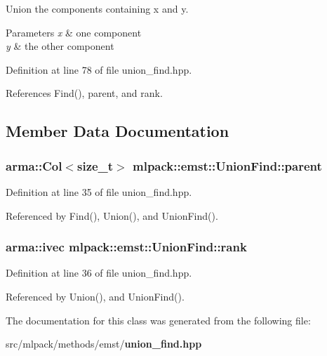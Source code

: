 Union the components containing x and y. 


\begin{DoxyParams}{Parameters}
{\em x} & one component \\
\hline
{\em y} & the other component \\
\hline
\end{DoxyParams}


Definition at line 78 of file union\-\_\-find.\-hpp.



References Find(), parent, and rank.



\subsection{Member Data Documentation}
\subsubsection[{parent}]{\setlength{\rightskip}{0pt plus 5cm}arma\-::\-Col$<$size\-\_\-t$>$ mlpack\-::emst\-::\-Union\-Find\-::parent\hspace{0.3cm}{\ttfamily [private]}}\label{classmlpack_1_1emst_1_1UnionFind_ab989de421794b4bc4ab930bec5a2c40b}


Definition at line 35 of file union\-\_\-find.\-hpp.



Referenced by Find(), Union(), and Union\-Find().

\subsubsection[{rank}]{\setlength{\rightskip}{0pt plus 5cm}arma\-::ivec mlpack\-::emst\-::\-Union\-Find\-::rank\hspace{0.3cm}{\ttfamily [private]}}\label{classmlpack_1_1emst_1_1UnionFind_a19f06f49e59750a0c06c1d781fc31476}


Definition at line 36 of file union\-\_\-find.\-hpp.



Referenced by Union(), and Union\-Find().



The documentation for this class was generated from the following file\-:\begin{DoxyCompactItemize}
\item 
src/mlpack/methods/emst/{\bf union\-\_\-find.\-hpp}\end{DoxyCompactItemize}
